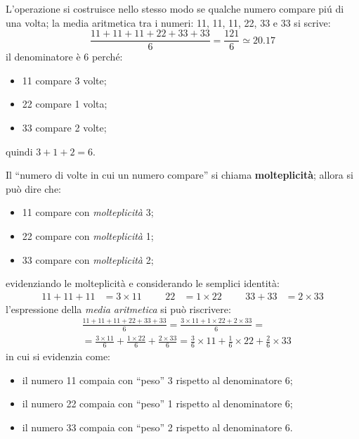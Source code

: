 \documentclass[12pt,a4paper]{article}
\newcommand{\Virgolette}[1]{``#1''}
\begin{document}
L'operazione si costruisce  nello stesso modo se qualche  numero compare piú di una  volta; la media
aritmetica tra i numeri: \num{11}, \num{11}, \num{11}, \num{22}, \num{33} e \num{33} si scrive:
\begin{equation*}
  \frac{\num{11} + \num{11} + \num{11} + \num{22} + \num{33} + \num{33}}{6}
  = \frac{121}{6} \simeq \num{20,17}
\end{equation*}
il denominatore è \num{6} perché:
\begin{itemize}
\item \num{11} compare \num{3} volte;
\item \num{22} compare \num{1} volta;
\item \num{33} compare \num{2} volte;
\end{itemize}
quindi \(\num{3} + \num{1} + \num{2} = \num{6}\).

Il \Virgolette{numero di volte in cui un  numero compare} si chiama \textbf{molteplicità}; allora si
può dire che:
\begin{itemize}
\item \num{11} compare con \emph{molteplicità} \num{3};
\item \num{22} compare con \emph{molteplicità} \num{1};
\item \num{33} compare con \emph{molteplicità} \num{2};
\end{itemize}
evidenziando le molteplicità e considerando le semplici identità:
\begin{align*}
  \num{11} + \num{11} + \num{11} &= \num{3} \times{} \num{11} &&&
  \num{22} &= \num{1} \times{} \num{22} &&&
  \num{33} + \num{33} &= \num{2} \times{} \num{33}
\end{align*}
l'espressione della \emph{media aritmetica} si può riscrivere:
\begin{align*}
  &\frac{\num{11} + \num{11} + \num{11} + \num{22} + \num{33} + \num{33}}{6}
  = \frac{\num{3} \times{} \num{11}
    + \num{1} \times{} \num{22}
    + \num{2} \times{} \num{33}}
    {6} = \\
  &=
    \frac{\num{3} \times{} \num{11}}{6} +
    \frac{\num{1} \times{} \num{22}}{6} +
    \frac{\num{2} \times{} \num{33}}{6}
  =
    \frac{\num{3}}{6} \times{} \num{11} +
    \frac{\num{1}}{6} \times{} \num{22} +
    \frac{\num{2}}{6} \times{} \num{33}
\end{align*}
in cui si evidenzia come:
\begin{itemize}
\item il numero \num{11} compaia con ``peso'' \num{3} rispetto al denominatore \num{6};
\item il numero \num{22} compaia con ``peso'' \num{1} rispetto al denominatore \num{6};
\item il numero \num{33} compaia con ``peso'' \num{2} rispetto al denominatore \num{6}.
\end{itemize}
\end{document}
